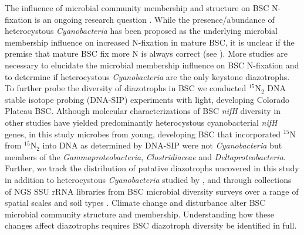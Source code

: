 The influence of microbial community membership and structure on BSC N-fixation
is an ongoing research question \citep{Belnap28062013}. While the
presence/abundance of heterocystous \textit{Cyanobacteria} has been proposed as the
underlying microbial membership influence on increased N-fixation in mature
BSC, it is unclear if the premise that mature BSC fix more N is always correct
(see \citet{15643930}). More studies are necessary to elucidate the microbial
membership influence on BSC N-fixation and to determine if heterocystous
\textit{Cyanobacteria} are the only keystone diazotrophs. To further probe the diversity
of diazotrophs in BSC we conducted $^{15}$N$_{2}$ DNA stable isotope probing
(DNA-SIP) experiments with light, developing Colorado Plateau BSC. Although
molecular characterizations of BSC \textit{nifH} diversity in other studies
have yielded predominantly heterocystous cyanobacterial \textit{nifH} genes, in
this study microbes from young, developing BSC that incorporated $^{15}$N from
$^{15}$N$_{2}$ into DNA as determined by DNA-SIP were not \textit{Cyanobacteria} but
members of the \textit{Gammaproteobacteria}, \textit{Clostridiaceae} and
\textit{Deltaproteobacteria}. Further, we track the distribution of putative
diazotrophs uncovered in this study in addition to heterocystous
\textit{Cyanobacteria} studied by \citet{14766579}, \citet{Yeager} and
\citet{Yeager_2012} through collections of NGS SSU rRNA libraries from BSC
microbial diversity surveys over a range of spatial scales and soil types
\citep{Garcia_Pichel_2013, Steven_2013}. Climate change and disturbance
alter BSC microbial community structure and membership. Understanding how
these changes affect diazotrophs requires BSC diazotroph diversity
be identified in full.
